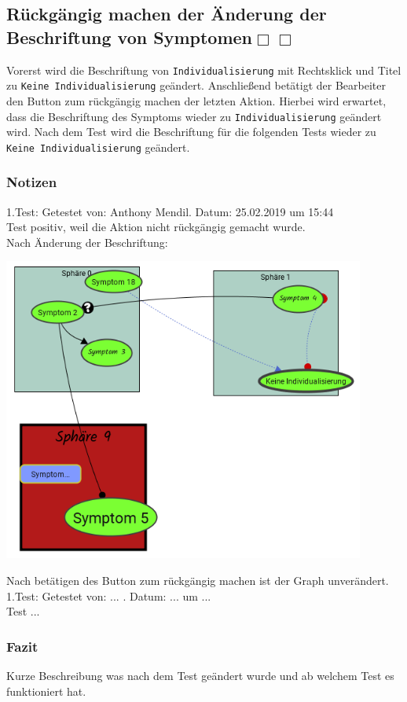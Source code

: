 \documentclass{scrartcl}
\newcommand{\subsectiont}[2]{\subsection[#1]{#1{\normalsize\normalfont #2}}}
\newcommand{\leer}{$\Box$}
\begin{document}
\subsectiont{Rückgängig machen der Änderung der \\Beschriftung von Symptomen}{\dotfill\XBox\leer\leer}
Vorerst wird die Beschriftung von \texttt{Individualisierung} mit Rechtsklick und Titel zu \texttt{Keine Individualisierung} geändert. Anschließend betätigt der Bearbeiter den Button zum rückgängig machen der letzten Aktion. Hierbei wird erwartet, dass die Beschriftung des Symptoms wieder zu \texttt{Individualisierung} geändert wird. Nach dem Test wird die Beschriftung für die folgenden Tests wieder zu \texttt{Keine Individualisierung} geändert.
\subsubsection{Notizen}
1.Test: Getestet von: Anthony Mendil. Datum: 25.02.2019 um 15:44 \\
Test positiv, weil die Aktion nicht rückgängig gemacht wurde. \\
Nach Änderung der Beschriftung: 
\begin{center}
\includegraphics[height=10cm]{3_48.PNG}
\end{center}
Nach betätigen des Button zum rückgängig machen ist der Graph unverändert. \\
1.Test: Getestet von: ... . Datum: ...  um ... \\
Test ... 
\subsubsection{Fazit}
Kurze Beschreibung was nach dem Test geändert wurde und ab welchem Test es funktioniert hat. 
\end{document}
